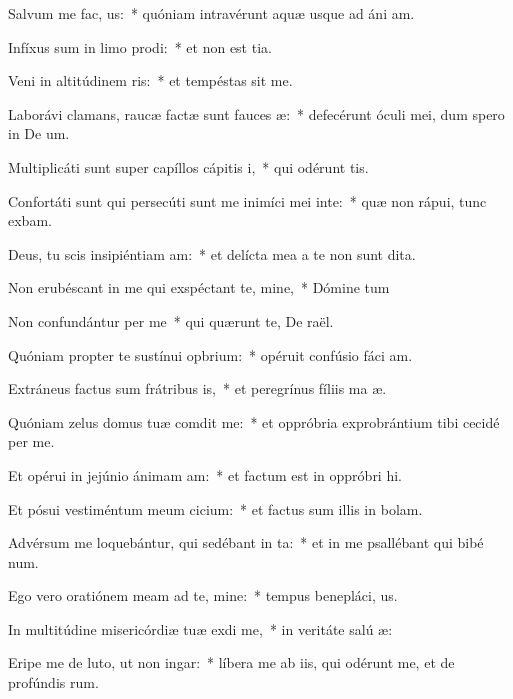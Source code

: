 \item Salvum me fac, us:~* quóniam intravérunt aquæ usque ad áni am.
\item Infíxus sum in limo prodi:~* et non est tia.
\item Veni in altitúdinem ris:~* et tempéstas sit me.
\item Laborávi clamans, raucæ factæ sunt fauces æ:~* defecérunt óculi mei, dum spero in De um.
\item Multiplicáti sunt super capíllos cápitis i,~* qui odérunt  tis.
\item Confortáti sunt qui persecúti sunt me inimíci mei inte:~* quæ non rápui, tunc exbam.
\item Deus, tu scis insipiéntiam am:~* et delícta mea a te non sunt dita.
\item Non erubéscant in me qui exspéctant te, mine,~* Dómine tum
\item Non confundántur per me~* qui quærunt te, De raël.
\item Quóniam propter te sustínui opbrium:~* opéruit confúsio fáci am.
\item Extráneus factus sum frátribus is,~* et peregrínus fíliis ma æ.
\item Quóniam zelus domus tuæ comdit me:~* et oppróbria exprobrántium tibi cecidé per me.
\item Et opérui in jejúnio ánimam am:~* et factum est in oppróbri hi.
\item Et pósui vestiméntum meum cicium:~* et factus sum illis in bolam.
\item Advérsum me loquebántur, qui sedébant in ta:~* et in me psallébant qui bibé num.
\item Ego vero oratiónem meam ad te, mine:~* tempus benepláci, us.
\item In multitúdine misericórdiæ tuæ exdi me,~* in veritáte salú æ:
\item Eripe me de luto, ut non ingar:~* líbera me ab iis, qui odérunt me, et de profúndis rum.
